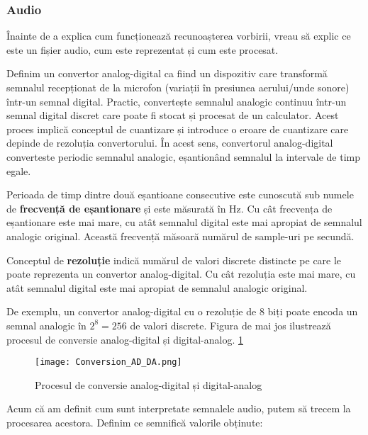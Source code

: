 \subsubsection{Audio}
Înainte de a explica cum funcționează recunoașterea vorbirii, vreau să explic ce este un fișier audio,
cum este reprezentat și cum este procesat.

\par
Definim un convertor analog-digital ca fiind un dispozitiv care transformă semnalul recepționat 
de la microfon (variații în presiunea aerului/unde sonore) într-un semnal digital.
Practic, convertește semnalul analogic continuu într-un
semnal digital discret care poate fi stocat și procesat de un calculator. Acest proces implică
conceptul de cuantizare și introduce o eroare de cuantizare care depinde de rezoluția convertorului.
În acest sens, convertorul analog-digital converteste periodic semnalul analogic, eșantionând semnalul
la intervale de timp egale.
\par
Perioada de timp dintre două eșantioane consecutive este cunoscută sub numele de \textbf{frecvență de eșantionare}
și este măsurată în Hz. Cu cât frecvența de eșantionare este mai mare, cu atât semnalul digital este mai apropiat
de semnalul analogic original. Această frecvență măsoară numărul de sample-uri pe secundă.
\par
Conceptul de \textbf{rezoluție} indică numărul de valori discrete distincte pe care le poate 
reprezenta un convertor analog-digital. Cu cât rezoluția este mai mare, cu atât semnalul digital
este mai apropiat de semnalul analogic original.
\par
De exemplu, un convertor analog-digital cu o rezoluție de 8 biți poate encoda un semnal analogic
în $2^8 = 256$ de valori discrete. Figura de mai jos ilustrează procesul de conversie analog-digital
și digital-analog. \ref{fig:conversion-ad-da}

\begin{figure}[h]
    \centering
    \texttt{[image: Conversion\_AD\_DA.png]}
    \caption{Procesul de conversie analog-digital și digital-analog\protect\footnotemark[1]}
    \label{fig:conversion-ad-da}
\end{figure}

\par
Acum că am definit cum sunt interpretate semnalele audio, putem să trecem la procesarea acestora.
Definim ce semnifică valorile obținute:

